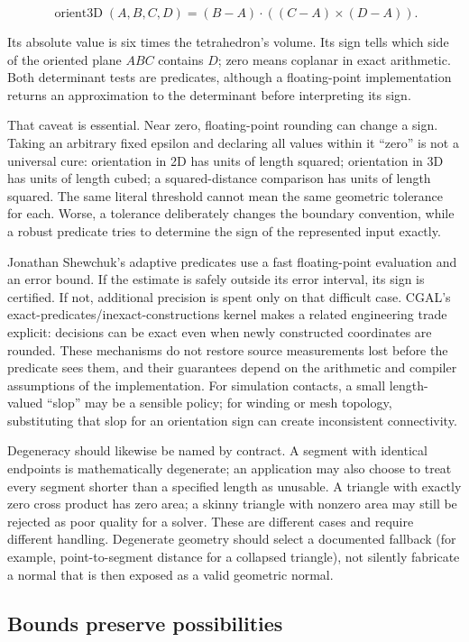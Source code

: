 \[
\operatorname{orient3D}(A,B,C,D)=(B-A)\cdot((C-A)\times(D-A)).
\]

Its absolute value is six times the tetrahedron's volume. Its sign tells which side of the oriented plane \(ABC\) contains \(D\); zero means coplanar in exact arithmetic. Both determinant tests are predicates, although a floating-point implementation returns an approximation to the determinant before interpreting its sign.

That caveat is essential. Near zero, floating-point rounding can change a sign. Taking an arbitrary fixed epsilon and declaring all values within it ``zero'' is not a universal cure: orientation in 2D has units of length squared; orientation in 3D has units of length cubed; a squared-distance comparison has units of length squared. The same literal threshold cannot mean the same geometric tolerance for each. Worse, a tolerance deliberately changes the boundary convention, while a robust predicate tries to determine the sign of the represented input exactly.

Jonathan Shewchuk's adaptive predicates use a fast floating-point evaluation and an error bound. If the estimate is safely outside its error interval, its sign is certified. If not, additional precision is spent only on that difficult case. CGAL's exact-predicates/inexact-constructions kernel makes a related engineering trade explicit: decisions can be exact even when newly constructed coordinates are rounded. These mechanisms do not restore source measurements lost before the predicate sees them, and their guarantees depend on the arithmetic and compiler assumptions of the implementation. For simulation contacts, a small length-valued ``slop'' may be a sensible policy; for winding or mesh topology, substituting that slop for an orientation sign can create inconsistent connectivity.

Degeneracy should likewise be named by contract. A segment with identical endpoints is mathematically degenerate; an application may also choose to treat every segment shorter than a specified length as unusable. A triangle with exactly zero cross product has zero area; a skinny triangle with nonzero area may still be rejected as poor quality for a solver. These are different cases and require different handling. Degenerate geometry should select a documented fallback (for example, point-to-segment distance for a collapsed triangle), not silently fabricate a normal that is then exposed as a valid geometric normal.

\subsection{Bounds preserve possibilities}\label{03-visual-computing-i-ch020-bounds-preserve-possibilities}

